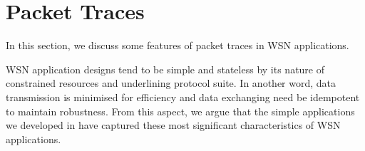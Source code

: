 \section{Packet Traces} \label{Sec: Packet Traces}

In this section, we discuss some features of packet traces in WSN applications.

%
%

WSN application designs tend to be simple and stateless by its nature of constrained resources and underlining protocol suite. In another word, data transmission is minimised for efficiency and data exchanging need be idempotent to maintain robustness. From this aspect, we argue that the simple applications we developed in  have captured these most significant characteristics of WSN applications.

